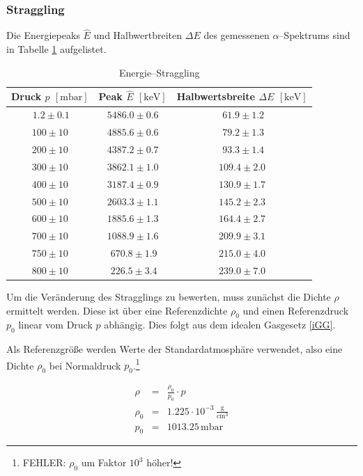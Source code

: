 \documentclass[12pt,a4paper]{scrartcl}
\numberwithin{equation}{section} %
\begin{document}
\hypertarget{energiestraggling-straggling}{%
	\subsubsection{Straggling}\label{energiestraggling-straggling}}
Die Energiepeaks $\hat E$ und Halbwertbreiten $\Delta E$ des gemessenen $\alpha$--Spektrums sind in Tabelle \ref{tabelle: Straggling} aufgelistet.
\begin{table}
	\centering
	\begin{tabular}[h]{||c|c|c||}
		\hline
		Druck $p$ $[\mathrm{mbar}]$ & Peak $\hat E$ $[\mathrm{keV}]$ & Halbwertsbreite $\Delta E$ $[\mathrm{keV}]$  \\
		\hline\hline
		$\ 1.2 \pm 0.1$ & $5486.0 \pm 0.6$ & $\ 61.9 \pm 1.2$ \\
		\hline
		$100 \pm 10$ & $4885.6 \pm 0.6$ & $\ 79.2 \pm 1.3$ \\
		\hline
		$200 \pm 10$ & $4387.2 \pm 0.7$ & $\ 93.3 \pm 1.4$ \\
		\hline
		$300 \pm 10$ & $3862.1 \pm 1.0$ & $109.4 \pm 2.0$ \\
		\hline
		$400 \pm 10$ & $3187.4 \pm 0.9$ & $130.9 \pm 1.7$ \\
		\hline
		$500 \pm 10$ & $2603.3 \pm 1.1$ & $145.2 \pm 2.3$ \\
		\hline
		$600 \pm 10$ & $1885.6 \pm 1.3$ & $164.4 \pm 2.7$ \\
		\hline
		$700 \pm 10$ & $1088.9 \pm 1.6$ & $209.9 \pm 3.1$ \\
		\hline
		$750 \pm 10$ & $\ 670.8 \pm 1.9$ & $215.0 \pm 4.0$ \\
		\hline
		$800 \pm 10$ & $\ 226.5 \pm 3.4$ & $239.0 \pm 7.0$ \\
		\hline
	\end{tabular}
	\caption{Energie--Straggling}
	\label{tabelle: Straggling}
\end{table}

Um die Veränderung des Stragglings zu bewerten, muss zunächst die Dichte $\rho$ ermittelt werden. Diese ist über eine Referenzdichte $\rho_0$ und einen Referenzdruck $p_0$ linear vom Druck $p$ abhängig.  Dies folgt aus dem idealen Gasgesetz \eqref{iGG}.

Als Referenzgröße werden Werte der Standardatmosphäre verwendet, also eine Dichte $\rho_0$ bei Normaldruck $p_0$.\footnote{FEHLER: $\rho_0$ um Faktor $10^3$ höher!} \cite{DWD}

\begin{eqnarray}
	\rho &=& \frac{\rho_0}{p_0} \cdot p \\
	\rho_0 &=& 1.225 \cdot 10^{-3}\mathrm{\,\frac{g}{cm^3}} \label{eq:Normaldichte Luft} \\
	p_0 &=& 1013.25 \mathrm{\,mbar} \label{eq:Normaldruck Luft}
\end{eqnarray}
\end{document}
